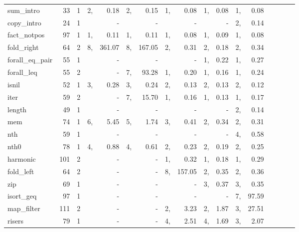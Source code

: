 \begin{table*}
\begin{center}
\begin{tabular}{|l|r|r|p{0pt}r|p{0pt}r|p{0pt}r|p{0pt}r|p{0pt}r|p{0pt}r|p{0pt}r|}
\hline
sum\_intro        &   33 & 1 &  2, &    0.18 &  2, &    0.15 &  1, &    0.08 &  1, &    0.08 &  1, &    0.08 \\
copy\_intro       &   24 & 1 &           & - &           & - &           & - &           & - &  2, &    0.14 \\
fact\_notpos      &   97 & 1 &  1, &    0.11 &  1, &    0.11 &  1, &    0.08 &  1, &    0.09 &  1, &    0.08 \\
fold\_right       &   64 & 2 &  8, &  361.07 &  8, &  167.05 &  2, &    0.31 &  2, &    0.18 &  2, &    0.34 \\
forall\_eq\_pair  &   55 & 1 &           & - &           & - &           & - &  1, &    0.22 &  1, &    0.27 \\
forall\_leq       &   55 & 2 &           & - &  7, &   93.28 &  1, &    0.20 &  1, &    0.16 &  1, &    0.24 \\
isnil             &   52 & 1 &  3, &    0.28 &  3, &    0.24 &  2, &    0.13 &  2, &    0.13 &  2, &    0.12 \\
iter              &   59 & 2 &           & - &  7, &   15.70 &  1, &    0.16 &  1, &    0.13 &  1, &    0.17 \\
length            &   49 & 1 &           & - &           & - &           & - &           & - &  2, &    0.14 \\
mem               &   74 & 1 &  6, &    5.45 &  5, &    1.74 &  3, &    0.41 &  2, &    0.34 &  2, &    0.31 \\
nth               &   59 & 1 &           & - &           & - &           & - &           & - &  4, &    0.58 \\
nth0              &   78 & 1 &  4, &    0.88 &  4, &    0.61 &  2, &    0.23 &  2, &    0.19 &  2, &    0.25 \\
harmonic          &  101 & 2 &           & - &           & - &  1, &    0.32 &  1, &    0.18 &  1, &    0.29 \\
fold\_left        &   64 & 2 &           & - &           & - &  8, &  157.05 &  2, &    0.35 &  2, &    0.36 \\
zip               &   69 & 1 &           & - &           & - &           & - &  3, &    0.37 &  3, &    0.35 \\
isort\_geq        &   97 & 1 &           & - &           & - &           & - &           & - &  7, &   97.59 \\
map\_filter       &  111 & 2 &           & - &           & - &  2, &    3.23 &  2, &    1.87 &  3, &   27.51 \\
risers            &   79 & 1 &           & - &           & - &  4, &    2.51 &  4, &    1.69 &  3, &    2.07 \\

\end{tabular}
\end{center}
\end{table*}
